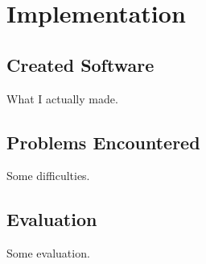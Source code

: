 \documentclass[../dissertation.tex]{subfiles}
\begin{document}
\chapter{Implementation}

\section{Created Software}

What I actually made.

\section{Problems Encountered}

Some difficulties.

\section{Evaluation}

Some evaluation.
\end{document}
